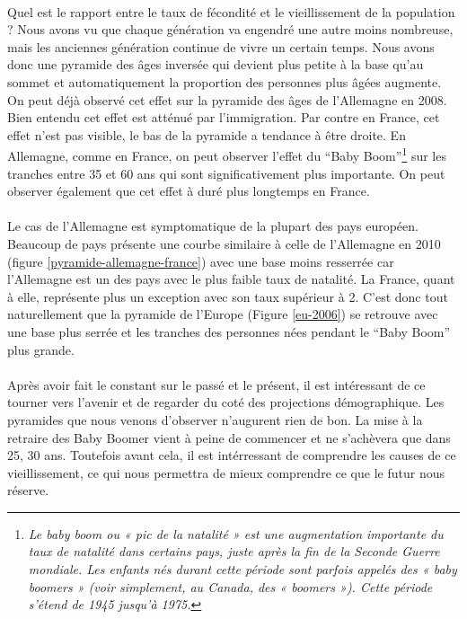 \paragraph{}Quel est le rapport entre le taux de fécondité et le vieillissement de la population ? Nous avons vu que chaque génération va engendré une autre moins nombreuse, mais les anciennes génération continue de vivre un certain temps. Nous avons donc une pyramide des âges inversée qui devient plus petite à la base qu’au sommet et automatiquement la proportion des personnes plus âgées augmente. On peut déjà observé cet effet sur la pyramide des âges de l’Allemagne en 2008. Bien entendu cet effet est atténué par l’immigration. Par contre en France, cet effet n’est pas visible, le bas de la pyramide a tendance à être droite.  En Allemagne, comme en France, on peut observer l’effet du “Baby Boom”\footnote{\textit{Le baby boom ou « pic de la natalité » est une augmentation importante du taux de natalité dans certains pays, juste après la fin de la Seconde Guerre mondiale. Les enfants nés durant cette période sont parfois appelés des « baby boomers » (voir simplement, au Canada, des « boomers »). Cette période s'étend de 1945 jusqu'à 1975.}\citep{baby-boom}} sur les tranches entre 35 et 60 ans qui sont significativement plus importante. On peut observer également que cet effet à duré plus longtemps en France.

\paragraph{}Le cas de l’Allemagne est symptomatique de la plupart des pays européen. Beaucoup de pays présente une courbe similaire à celle de l’Allemagne en 2010 (figure \ref{pyramide-allemagne-france}) avec une base moins resserrée car l’Allemagne est un des pays avec le plus faible taux de natalité. La France, quant à elle, représente plus un exception avec son taux supérieur à 2. C’est donc tout naturellement que la pyramide de l’Europe (Figure \ref{eu-2006}) se retrouve avec une base plus serrée et les tranches des personnes nées pendant le “Baby Boom” plus grande. 

\paragraph{}Après avoir fait le constant sur le passé et le présent, il est intéressant de ce tourner vers l’avenir et de regarder du coté des projections démographique. Les pyramides que nous venons d’observer n’augurent rien de bon. La mise à la retraire des Baby Boomer vient à peine de commencer et ne s’achèvera que dans 25, 30 ans. Toutefois avant cela, il est intérressant de comprendre les causes de ce vieillissement, ce qui nous permettra de mieux comprendre ce que le futur nous réserve. 

